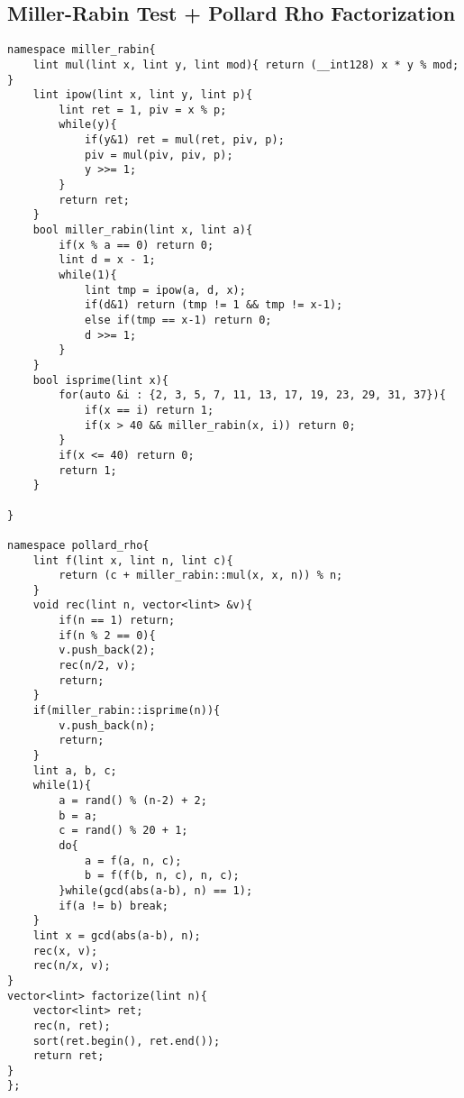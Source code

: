 \documentclass[landscape, 8pt, a4paper, oneside,  twocolumn]{extarticle}
\begin{document}
\subsection{Miller-Rabin Test + Pollard Rho Factorization}
\begin{verbatim}
namespace miller_rabin{
    lint mul(lint x, lint y, lint mod){ return (__int128) x * y % mod; } 
	lint ipow(lint x, lint y, lint p){
		lint ret = 1, piv = x % p;
		while(y){
			if(y&1) ret = mul(ret, piv, p);
			piv = mul(piv, piv, p);
			y >>= 1;
		}
		return ret;
	}
	bool miller_rabin(lint x, lint a){
		if(x % a == 0) return 0;
		lint d = x - 1;
		while(1){
			lint tmp = ipow(a, d, x);
			if(d&1) return (tmp != 1 && tmp != x-1);
			else if(tmp == x-1) return 0;
			d >>= 1;
		}
	}
	bool isprime(lint x){
		for(auto &i : {2, 3, 5, 7, 11, 13, 17, 19, 23, 29, 31, 37}){
			if(x == i) return 1;
			if(x > 40 && miller_rabin(x, i)) return 0;
		}
		if(x <= 40) return 0;
		return 1;
	}
	
}

namespace pollard_rho{
	lint f(lint x, lint n, lint c){
		return (c + miller_rabin::mul(x, x, n)) % n;
	}
	void rec(lint n, vector<lint> &v){
		if(n == 1) return;
		if(n % 2 == 0){
		v.push_back(2);
		rec(n/2, v);
		return;
	}
	if(miller_rabin::isprime(n)){
		v.push_back(n);
		return;
	}
	lint a, b, c;
	while(1){
		a = rand() % (n-2) + 2;
		b = a;
		c = rand() % 20 + 1;
		do{
			a = f(a, n, c);
			b = f(f(b, n, c), n, c);
		}while(gcd(abs(a-b), n) == 1);
		if(a != b) break;
	}
	lint x = gcd(abs(a-b), n);
	rec(x, v);
	rec(n/x, v);
}
vector<lint> factorize(lint n){
	vector<lint> ret;
	rec(n, ret);
	sort(ret.begin(), ret.end());
	return ret;
}
};
\end{verbatim}
\end{document}
